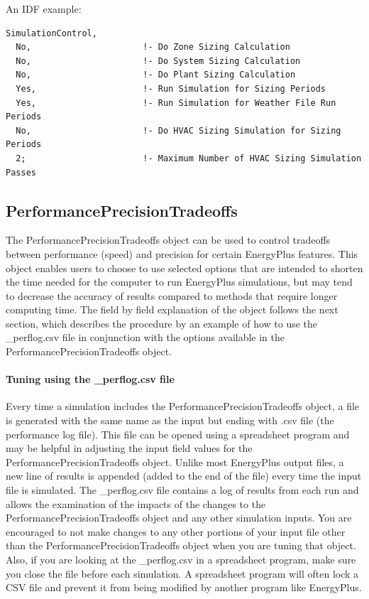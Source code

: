 An IDF example:

\begin{lstlisting}
SimulationControl,
  No,                      !- Do Zone Sizing Calculation
  No,                      !- Do System Sizing Calculation
  No,                      !- Do Plant Sizing Calculation
  Yes,                     !- Run Simulation for Sizing Periods
  Yes,                     !- Run Simulation for Weather File Run Periods
  No,                      !- Do HVAC Sizing Simulation for Sizing Periods
  2;                       !- Maximum Number of HVAC Sizing Simulation Passes
\end{lstlisting}

\subsection{PerformancePrecisionTradeoffs}\label{performanceprecisiontradeoffs}

The PerformancePrecisionTradeoffs object can be used to control tradeoffs between performance (speed) and precision for certain EnergyPlus features. This object enables users to choose to use selected options that are intended to shorten the time needed for the computer to run EnergyPlus simulations, but may tend to decrease the accuracy of results compared to methods that require longer computing time. The field by field explanation of the object follows the next section, which describes the procedure by an example of how to use the \_perflog.csv file in conjunction with the options available in the PerformancePrecisionTradeoffs object.

\paragraph{Tuning using the \_perflog.csv file}\label{tuning-using-perlog-csv-file}

Every time a simulation includes the PerformancePrecisionTradeoffs object, a file is generated with the same name as the input but ending with \erflog.csv file (the performance log file). This file can be opened using a spreadsheet program and may be helpful in adjusting the input field values for the PerformancePrecisionTradeoffs object. Unlike most EnergyPlus output files, a new line of results is appended (added to the end of the file) every time the input file is simulated. The \_perflog.csv file contains a log of results from each run and allows the examination of the impacts of the changes to the PerformancePrecisionTradeoffs object and any other simulation inputs. You are encouraged to not make changes to any other portions of your input file other than the PerformancePrecisionTradeoffs object when you are tuning that object. Also, if you are looking at the \_perflog.csv in a spreadsheet program, make sure you close the file before each simulation. A spreadsheet program will often lock a CSV file and prevent it from being modified by another program like EnergyPlus.

